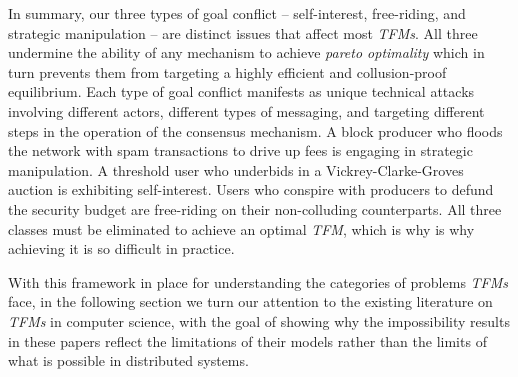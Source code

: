 In summary, our three types of goal conflict -- self-interest, free-riding, and strategic manipulation -- are distinct issues that affect most \textit{TFMs}. All three undermine the ability of any mechanism to achieve \textit{pareto optimality} which in turn prevents them from targeting a highly efficient and collusion-proof equilibrium. Each type of goal conflict manifests as unique technical attacks involving different actors, different types of messaging, and targeting different steps in the operation of the consensus mechanism. A block producer who floods the network with spam transactions to drive up fees is engaging in strategic manipulation. A threshold user who underbids in a Vickrey-Clarke-Groves auction is exhibiting self-interest. Users who conspire with producers to defund the security budget are free-riding on their non-colluding counterparts. All three classes must be eliminated to achieve an optimal \textit{TFM}, which is why is why achieving it is so difficult in practice.

With this framework in place for understanding the categories of problems \textit{TFMs} face, in the following section we turn our attention to the existing literature on \textit{TFMs} in computer science, with the goal of showing why the impossibility results in these papers reflect the limitations of their models rather than the limits of what is possible in distributed systems.

